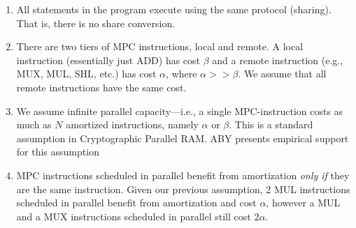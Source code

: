 \documentclass[sigconf, screen, natbib=false, dvipsnames, table]{acmart}
\theoremstyle{definition}
\begin{document}
\begin{enumerate}
\item All statements in the program execute using the same protocol (sharing). That is, there is no share conversion. 
\item There are two tiers of MPC instructions, local and remote. A local instruction (essentially just ADD) has cost $\beta$ 
and a remote instruction (e.g., MUX, MUL, SHL, etc.) has cost $\alpha$, where $\alpha >> \beta$. We assume that all remote 
instructions have the same cost.
\item We assume infinite parallel capacity---i.e., a single MPC-instruction costs as much as $N$ amortized instructions, namely $\alpha$ or $\beta$. 
This is a standard assumption in Cryptographic Parallel RAM. ABY presents empirical support for this assumption~
\item MPC instructions scheduled in parallel benefit from amortization \emph{only if} they are the same instruction. Given our previous assumption,
2 MUL instructions scheduled in parallel benefit from amortization and cost $\alpha$, however a MUL and a MUX instructions scheduled
in parallel still cost $2\alpha$. 
\end{enumerate}


\end{document}
